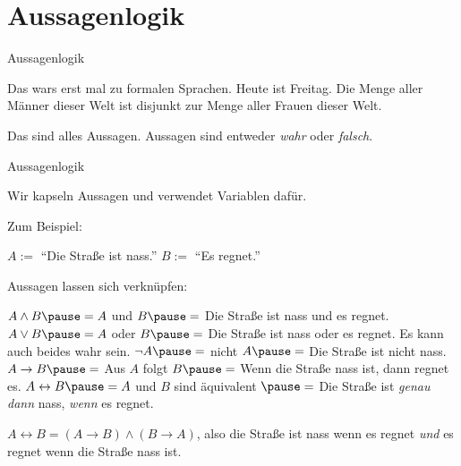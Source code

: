 


\section{Aussagenlogik}

\begin{frame}{Aussagenlogik}
	\begin{itemize}
		\pitem Das wars erst mal zu formalen Sprachen.
		\pitem Heute ist Freitag.
		\pitem Die Menge aller Männer dieser Welt ist disjunkt zur Menge aller Frauen dieser Welt.
	\end{itemize}

	\pause
	
	Das sind alles Aussagen. \pause Aussagen sind entweder \emph{wahr} \pause oder \emph{falsch}.
\end{frame}

\begin{frame}{Aussagenlogik}
	\pause 
	
	Wir kapseln Aussagen und verwendet Variablen dafür. \pause 
	
	Zum Beispiel:
	
	\begin{itemize}
		\pitem $A := $ ``Die Straße ist nass.''
		\pitem $B := $ ``Es regnet.''
	\end{itemize}

	\pause Aussagen lassen sich verknüpfen:
	
	\begin{itemize}
		\pitem {} \pause $A \land B \pause = A$ und $B \pause = $ Die Straße ist nass und es regnet.
		\pitem {} \pause $A \lor B \pause = A$ oder $B \pause = $ Die Straße ist nass oder es regnet\pause . Es kann auch beides wahr sein.
		\pitem {} \pause $\lnot A \pause = $ nicht $A \pause = $ Die Straße ist nicht nass.
		\pitem {} \pause $A \rightarrow B \pause = $ Aus $A$ folgt $B \pause = $ Wenn die Straße nass ist, dann regnet es.
		\pitem {} \pause $A \leftrightarrow B \pause = A$ und $B$ sind äquivalent $\pause = $ Die Straße ist \emph{genau dann} nass, \emph{wenn} es regnet.
		\begin{itemize}
			\pitem $A \leftrightarrow B = (A \rightarrow B) \land (B \rightarrow A)$\pause , also die Straße ist nass wenn es regnet \emph{und} es regnet wenn die Straße nass ist.
		\end{itemize}
	\end{itemize}

\end{frame}

